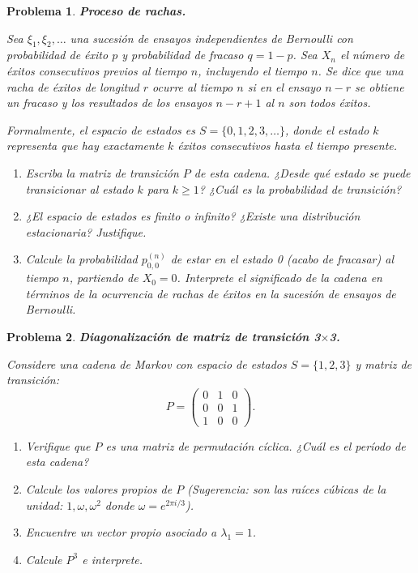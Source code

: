 \documentclass[12pt]{article}
\newtheorem{problem}{Problema}
\begin{document}
\begin{problem}
\textbf{Proceso de rachas.}

Sea $\xi_1, \xi_2, \ldots$ una sucesión de ensayos independientes de Bernoulli con probabilidad de éxito $p$ y probabilidad de fracaso $q = 1-p$. Sea $X_n$ el número de éxitos consecutivos previos al tiempo $n$, incluyendo el tiempo $n$. Se dice que una racha de éxitos de longitud $r$ ocurre al tiempo $n$ si en el ensayo $n-r$ se obtiene un fracaso y los resultados de los ensayos $n-r+1$ al $n$ son todos éxitos.

Formalmente, el espacio de estados es $S = \{0, 1, 2, 3, \ldots\}$, donde el estado $k$ representa que hay exactamente $k$ éxitos consecutivos hasta el tiempo presente.

\begin{enumerate}
    \item[(a)] Escriba la matriz de transición $P$ de esta cadena. ¿Desde qué estado se puede transicionar al estado $k$ para $k \geq 1$? ¿Cuál es la probabilidad de transición?
    
    \item[(b)] ¿El espacio de estados es finito o infinito? ¿Existe una distribución estacionaria? Justifique.
    
    \item[(c)] Calcule la probabilidad $p_{0,0}^{(n)}$ de estar en el estado 0 (acabo de fracasar) al tiempo $n$, partiendo de $X_0 = 0$. Interprete el significado de la cadena en términos de la ocurrencia de rachas de éxitos en la sucesión de ensayos de Bernoulli.
\end{enumerate}
\end{problem}

\begin{problem}
\textbf{Diagonalización de matriz de transición 3$\times$3.}

Considere una cadena de Markov con espacio de estados $S = \{1, 2, 3\}$ y matriz de transición:
\[
P = \begin{pmatrix}
0 & 1 & 0 \\
0 & 0 & 1 \\
1 & 0 & 0
\end{pmatrix}.
\]

\begin{enumerate}
    \item[(a)] Verifique que $P$ es una matriz de permutación cíclica. ¿Cuál es el período de esta cadena?
    
    \item[(b)] Calcule los valores propios de $P$ (Sugerencia: son las raíces cúbicas de la unidad: $1, \omega, \omega^2$ donde $\omega = e^{2\pi i/3}$).
    
    \item[(c)] Encuentre un vector propio asociado a $\lambda_1 = 1$.
    
    \item[(d)] Calcule $P^3$ e interprete.
    \end{enumerate}
\end{problem}
\end{document}
